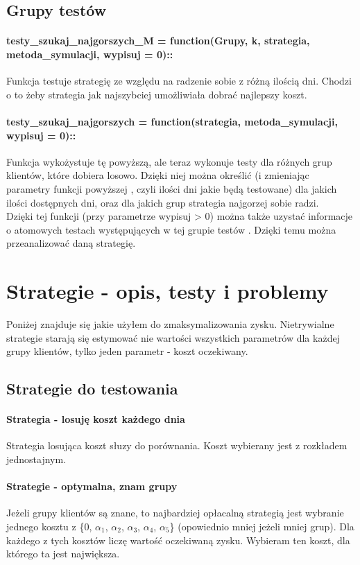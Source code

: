\documentclass{article}
\begin{document}
\subsection{Grupy testów}
\paragraph{testy\_szukaj\_najgorszych\_M = function(Grupy, k, strategia, metoda\_symulacji, wypisuj = 0)::} Funkcja testuje strategię
ze względu na radzenie sobie z różną ilością dni. Chodzi o to żeby strategia jak najszybciej umożliwiała dobrać
najlepszy koszt.
\paragraph{testy\_szukaj\_najgorszych = function(strategia, metoda\_symulacji, wypisuj = 0)::} Funkcja wykożystuje tę powyższą, ale teraz
wykonuje testy dla różnych grup klientów, które dobiera losowo. Dzięki niej można określić (i zmieniając parametry funkcji powyższej
, czyli ilości dni jakie będą testowane) dla jakich ilości dostępnych dni, oraz dla jakich grup strategia najgorzej sobie radzi.
\\ Dzięki tej funkcji (przy parametrze wypisuj > 0) można także uzystać informacje o atomowych testach występujących w tej grupie testów
. Dzięki temu można przeanalizować daną strategię.

\section{Strategie - opis, testy i problemy}
Poniżej znajduje się jakie użyłem do zmaksymalizowania zysku.
Nietrywialne strategie starają się estymować nie wartości wszystkich parametrów dla każdej grupy klientów, tylko 
jeden parametr - koszt oczekiwany.

\subsection{Strategie do testowania}
\paragraph{Strategia - losuję koszt każdego dnia}
Strategia losująca koszt słuzy do porównania. Koszt wybierany jest z rozkładem jednostajnym.
\paragraph{Strategie - optymalna, znam grupy}
Jeżeli grupy klientów są znane, to najbardziej opłacalną strategią jest wybranie jednego kosztu z \{0, $\alpha_1$, $\alpha_2$,
   $\alpha_3$, $\alpha_4$, $\alpha_5$\} (opowiednio mniej jeżeli mniej grup). Dla każdego z tych kosztów liczę wartość oczekiwaną
   zysku. Wybieram ten koszt, dla którego ta jest największa.
\end{document}
